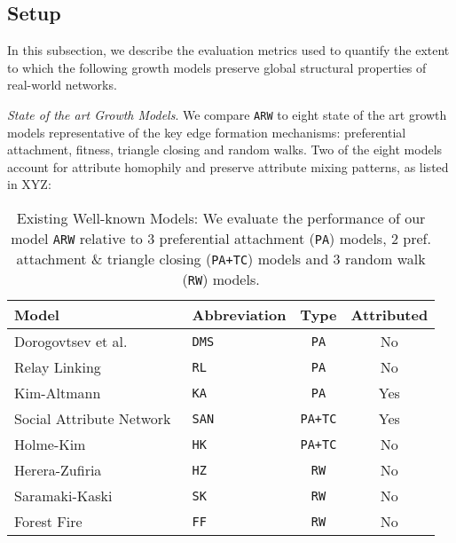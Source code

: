 \subsection{Setup}
\label{sub:Experimental Setup}

In this subsection, we describe the evaluation metrics used to quantify the extent to
which the following growth models preserve global structural properties of real-world networks.

\textit{State of the art Growth Models}. We compare \texttt{ARW} to eight state of the art
growth models representative of the key edge formation
mechanisms: preferential attachment, fitness, triangle closing and random walks.
Two of the eight models account for attribute homophily and preserve attribute mixing patterns,
as listed in XYZ:

\begin{table}[b]
 \center
 {
  \begin{tabular}[c]{llcc} \toprule
  Model &  Abbreviation & Type & Attributed \\ \midrule
  Dorogovtsev et al.~\cite{dorogovtsev2000structure} & \texttt{DMS} & \texttt{PA} & No  \\
  Relay Linking~\cite{singh2017relay} 						  & \texttt{RL} & \texttt{PA} & No  \\
  Kim-Altmann~\cite{kim2017effect} 							  & \texttt{KA} & \texttt{PA} & Yes  \\ \midrule
  Social Attribute Network~\cite{gong2012evolution} 	  & \texttt{SAN} & \texttt{PA+TC} & Yes  \\
  Holme-Kim~\cite{holme2002growing} 						  & \texttt{HK} & \texttt{PA+TC} & No  \\ \midrule
  Herera-Zufiria~\cite{herrera2011generating} 				  & \texttt{HZ} & \texttt{RW} & No  \\
  Saramaki-Kaski~\cite{saramaki2004scale} 					  & \texttt{SK} & \texttt{RW} & No  \\
  Forest Fire~\cite{leskovec2005graphs} 					  & \texttt{FF} & \texttt{RW} & No  \\
   \bottomrule
  \end{tabular}
  \vspace{1mm}
  \caption{
  	  Existing Well-known Models: We evaluate the performance of our model \texttt{ARW} relative to 3 preferential attachment
	  (\texttt{PA}) models, 2 pref. attachment \& triangle closing (\texttt{PA+TC}) models and 3 random walk (\texttt{RW}) models.
  }
  \label{table:models}
 }
\end{table}

